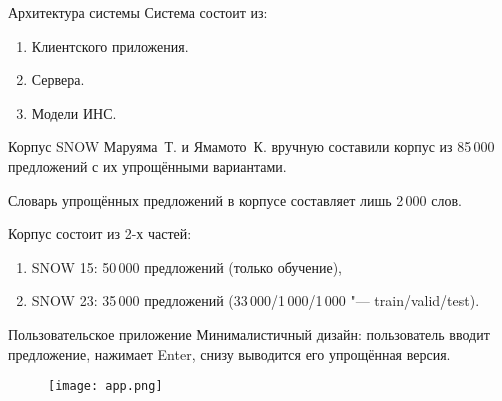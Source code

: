 \begin{frame}[fragile]{Архитектура системы}%
  Система состоит из:
  \begin{enumerate}[1.]%
    \item Клиентского приложения. \\ 
    \item Сервера. \\ 
    \item Модели ИНС. \\
  \end{enumerate}
\end{frame}


\begin{frame}[fragile]{Корпус SNOW}%
  Маруяма~Т. и Ямамото~К. вручную составили корпус из 85\,000 предложений с их упрощёнными вариантами.

  Словарь упрощённых предложений в корпусе составляет лишь 2\,000 слов.
  
  Корпус состоит из 2-х частей:
  \begin{enumerate}[1.]%
    \item SNOW 15: 50\,000 предложений (только обучение),
    \item SNOW 23: 35\,000 предложений (33\,000/1\,000/1\,000 "--- train/valid/test).
  \end{enumerate}
\end{frame}


\begin{frame}[fragile]{Пользовательское приложение}%
  Минималистичный дизайн: пользователь вводит предложение, нажимает Enter, снизу выводится его упрощённая версия.
  \begin{figure}[H]%
    \centering
    \texttt{[image: app.png]}
    \label{app-screen}
  \end{figure}
\end{frame}


